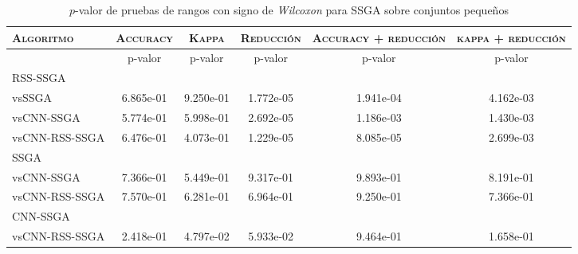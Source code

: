 \begin{table}[h!]
\centering
\begin{adjustbox}{max width =\textwidth}
\begin{tabular}{l c c c c c}
\hline
	\textsc{Algoritmo}
	& \multicolumn{1}{c}{\textsc{Accuracy}}
	& \multicolumn{1}{c}{\textsc{Kappa}}
	& \multicolumn{1}{c}{\textsc{Reducción}} 
	& \multicolumn{1}{c}{\textsc{Accuracy + reducción}} 
	& \multicolumn{1}{c}{\textsc{kappa + reducción}} \\

\hline
\hline

 & p-valor & p-valor & p-valor & p-valor & p-valor \\

RSS-SSGA\\
vsSSGA & 6.865e-01 & 9.250e-01 & 1.772e-05 & 1.941e-04 & 4.162e-03 \\ 
vsCNN-SSGA & 5.774e-01 & 5.998e-01 & 2.692e-05 & 1.186e-03 & 1.430e-03 \\
vsCNN-RSS-SSGA & 6.476e-01 & 4.073e-01 & 1.229e-05 & 8.085e-05 & 2.699e-03 \\

\hline

SSGA\\
vsCNN-SSGA & 7.366e-01 & 5.449e-01 & 9.317e-01 & 9.893e-01 & 8.191e-01 \\  
vsCNN-RSS-SSGA & 7.570e-01 & 6.281e-01 & 6.964e-01 & 9.250e-01 & 7.366e-01 \\ 

\hline

CNN-SSGA\\
vsCNN-RSS-SSGA & 2.418e-01 & 4.797e-02 & 5.933e-02 & 9.464e-01 & 1.658e-01 \\

\hline 

\end{tabular}
\end{adjustbox}
\caption[Pruebas de \emph{Wilcoxon} entre SSGA y variaciones para conjuntos pequeños]{$p$-valor de pruebas de rangos con signo de \emph{Wilcoxon} para SSGA sobre conjuntos pequeños}
\label{wilcox-SSGA-peq}
\end{table}


